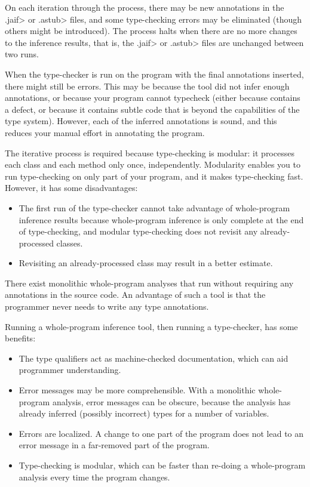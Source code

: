 On each
iteration through the process, there may be new annotations in the \<.jaif> or \<.astub>
files, and some type-checking errors may be eliminated (though others might
be introduced).
The process halts when there are no more changes to the inference results,
that is, the \<.jaif> or \<.astub> files are unchanged between two runs.

When the type-checker is run on the program with the final annotations
inserted, there might still be errors.  This may be because the tool did
not infer enough annotations, or because your program cannot typecheck
(either because contains a defect, or because it contains subtle code that
is beyond the capabilities of the type system).
However, each of the inferred annotations is sound, and this reduces your
manual effort in annotating the program.

The iterative process is required because type-checking is modular:  it
processes each class and each method only once, independently.  Modularity
enables you to run type-checking on only part of your program, and it makes
type-checking fast.  However, it has some disadvantages:
\begin{itemize}
\item
  The first run of the type-checker cannot take advantage of whole-program
  inference results because whole-program inference is only complete at the
  end of type-checking, and modular type-checking does not revisit any
  already-processed classes.
\item
  Revisiting an
  already-processed class may result in a better estimate.
\end{itemize}



There exist monolithic whole-program analyses that run without requiring any
annotations in the source code.  An advantage of such a tool is that the
programmer never needs to write any type annotations.

Running a whole-program inference tool, then running a type-checker, has
some benefits:
\begin{itemize}
\item
  The type qualifiers act as machine-checked documentation,
  which can aid programmer understanding.
\item
  Error messages may be more comprehensible.  With a monolithic
  whole-program analysis, error messages can be obscure, because the
  analysis has already inferred (possibly incorrect) types for a number of
  variables.
\item
  Errors are localized.  A change to one part of the program does not lead
  to an error message in a far-removed part of the program.
\item
  Type-checking is modular, which can be faster than re-doing a
  whole-program analysis every time the program changes.
\end{itemize}



